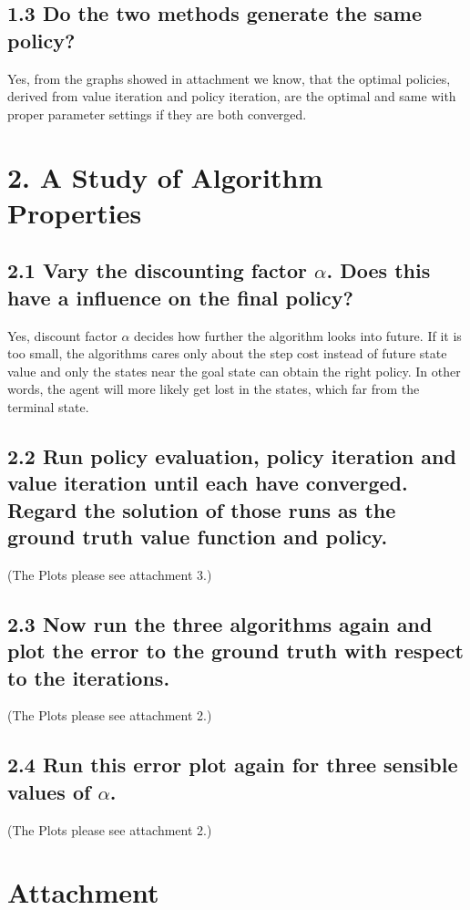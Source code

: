 \documentclass[12pt,a4paper,titlepage]{article}
\begin{document}
\subsection*{1.3 Do the two methods generate the same policy?}
Yes, from the graphs showed in attachment we know, that the optimal policies, derived from value iteration and policy iteration, are the optimal and same with proper parameter settings if they are both converged.

\section*{2. A Study of Algorithm Properties}
\subsection*{2.1 Vary the discounting factor $\alpha$. Does this have a influence on the final policy?}
Yes, discount factor $\alpha$ decides how further the algorithm looks into future. If it is too small, the algorithms cares only about the step cost instead of future state value and only the states near the goal state can obtain the right policy. In other words, the agent will more likely get lost in the states, which far from the terminal state.
\subsection*{2.2 Run policy evaluation, policy iteration and value iteration until each have converged. Regard the solution of those runs as the ground truth value function and policy.}
(The Plots please see attachment 3.)
\subsection*{2.3 Now run the three algorithms again and plot the error to the ground truth with respect to the iterations.}
(The Plots please see attachment 2.)
\subsection*{2.4 Run this error plot again for three sensible values of $\alpha$.}
(The Plots please see attachment 2.)
\newpage
\section*{Attachment}
\end{document}
